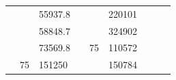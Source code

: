 \begin{table}[]
\begin{tabular}{|cclccllll}
\multicolumn{1}{|c|}{\cellcolor[HTML]{FFFFC7}}                                & \multicolumn{1}{c|}{\cellcolor[HTML]{DAE8FC}}                      & \multicolumn{1}{l|}{\cellcolor[HTML]{DAE8FC}55937.8}   & \multicolumn{1}{c|}{\cellcolor[HTML]{FFFFC7}}                                & \multicolumn{1}{c|}{\cellcolor[HTML]{DAE8FC}}                       & \multicolumn{1}{l|}{\cellcolor[HTML]{DDFDFF}220101}    &                                                                              &                                                                    &                                                        \\ \cline{3-3} \cline{6-6}
\multicolumn{1}{|c|}{\cellcolor[HTML]{FFFFC7}}                                & \multicolumn{1}{c|}{\cellcolor[HTML]{DAE8FC}}                      & \multicolumn{1}{l|}{\cellcolor[HTML]{DDFDFF}58848.7}   & \multicolumn{1}{c|}{\cellcolor[HTML]{FFFFC7}}                                & \multicolumn{1}{c|}{\cellcolor[HTML]{DAE8FC}}                       & \multicolumn{1}{l|}{\cellcolor[HTML]{DAE8FC}324902}    &                                                                              &                                                                    &                                                        \\ \cline{3-3} \cline{6-6}
\multicolumn{1}{|c|}{\cellcolor[HTML]{FFFFC7}}                                & \multicolumn{1}{c|}{\cellcolor[HTML]{DAE8FC}}                      & \multicolumn{1}{l|}{\cellcolor[HTML]{DAE8FC}73569.8}   & \multicolumn{1}{c|}{\cellcolor[HTML]{FFFFC7}}                                & \multicolumn{1}{c|}{\multirow{-10}{*}{\cellcolor[HTML]{DAE8FC}75}}  & \multicolumn{1}{l|}{\cellcolor[HTML]{DDFDFF}110572}    &                                                                              &                                                                    &                                                        \\ \cline{3-3} \cline{5-6}
\multicolumn{1}{|c|}{\cellcolor[HTML]{FFFFC7}}                                & \multicolumn{1}{c|}{\multirow{-10}{*}{\cellcolor[HTML]{DAE8FC}75}} & \multicolumn{1}{l|}{\cellcolor[HTML]{DDFDFF}151250}    & \multicolumn{1}{c|}{\cellcolor[HTML]{FFFFC7}}                                & \multicolumn{1}{c|}{\cellcolor[HTML]{DDFDFF}}                       & \multicolumn{1}{l|}{\cellcolor[HTML]{DAE8FC}150784}    &                                                                              &                                                                    &                                                        \\ \cline{2-3} \cline{6-6}

\end{tabular}
\end{table}
